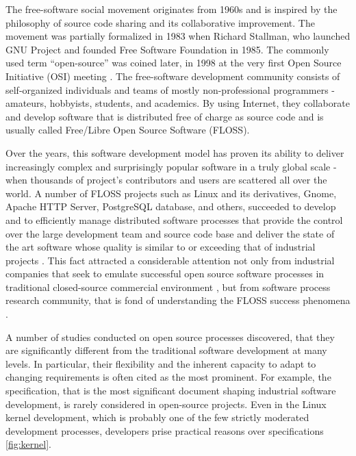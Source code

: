The free-software social movement originates from 1960s and is inspired by the philosophy of 
source code sharing and its collaborative improvement. The movement was partially formalized in 1983 
when Richard Stallman, who launched GNU Project and founded Free Software Foundation in 1985.
The commonly used term ``open-source'' was coined later, in 1998 at the very first Open Source 
Initiative (OSI) meeting \cite{osi-history}.
The free-software development community consists of self-organized individuals and teams of 
mostly non-professional programmers - amateurs, hobbyists, students, and academics. 
By using Internet, they collaborate and develop software that is distributed free of charge as source code
and is usually called Free/Libre Open Source Software (FLOSS). 

Over the years, this software development model has proven its ability to deliver increasingly complex 
and surprisingly popular software in a truly global scale - when thousands of project's contributors 
and users are scattered all over the world. A number of FLOSS projects such as Linux and its 
derivatives, Gnome, Apache HTTP Server, PostgreSQL database, and others, succeeded to develop and to 
efficiently manage distributed software processes that provide the control over the large development 
team and source code base and deliver the state of the art software whose quality is similar to or 
exceeding that of industrial projects \cite{coverity2012}. 
This fact attracted a considerable attention not only from industrial companies that seek to emulate 
successful open source software processes in traditional closed-source commercial environment 
\cite{oss_virtual_organizations} \cite{oss_balance} \cite{oss_hp} \cite{oss_4industry}, 
but from software process research community, that is fond of understanding the FLOSS success phenomena
\cite{citeulike:12550640} \cite{citeulike:5043664} \cite{citeulike:5128808} \cite{citeulike:10377366}.


A number of studies conducted on open source processes discovered, that they are significantly 
different from the traditional software development at many levels. 
In particular, their flexibility and the inherent capacity to adapt to changing requirements is often cited as 
the most prominent. 
For example, the specification, that is the most significant document shaping industrial software development,
is rarely considered in open-source projects. Even in the Linux kernel development, which is probably one of 
the few strictly moderated development processes, developers prise practical reasons over specifications \ref{fig:kernel}.

